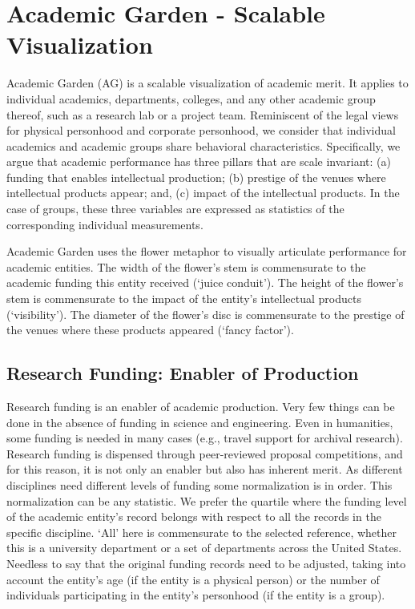 \section {Academic Garden - Scalable Visualization}
Academic Garden (AG) is a scalable visualization of academic merit. It applies to individual academics, departments, colleges, and any other academic group thereof, such as a research lab or a project team. Reminiscent of the legal views for physical personhood and corporate personhood, we consider that individual academics and academic groups share behavioral characteristics. Specifically, we argue that academic performance has three pillars that are scale invariant: (a) funding that enables intellectual production; (b) prestige of the venues where intellectual products appear; and, (c) impact of the intellectual products. In the case of groups, these three variables are expressed as statistics of the corresponding individual measurements. 

Academic Garden uses the flower metaphor to visually articulate performance for academic entities. The width of the flower's stem is commensurate to the academic funding this entity received (`juice conduit'). The height of the flower's stem is commensurate to the impact of the entity's intellectual products (`visibility'). The diameter of the flower's disc is commensurate to the prestige of the venues where these products appeared (`fancy factor'). %




\subsection {Research Funding: Enabler of Production}
Research funding is an enabler of academic production. Very few things can be done in the absence of funding in science and engineering. Even in humanities, some funding is needed in many cases (e.g., travel support for archival research).  Research funding is dispensed through peer-reviewed proposal competitions, and for this reason, it is not only an enabler but also has inherent merit. As different disciplines need different levels of funding some normalization is in order. This normalization can be any statistic. We prefer the quartile where the funding level of the academic entity's record belongs with respect to all the records in the specific discipline.  `All' here is commensurate to the selected reference, whether this is a university department or a set of departments across the United States. Needless to say that the original funding records need to be adjusted, taking into account the entity's age (if the entity is a physical person) or the number of individuals participating in the entity's personhood (if the entity is a group). 

